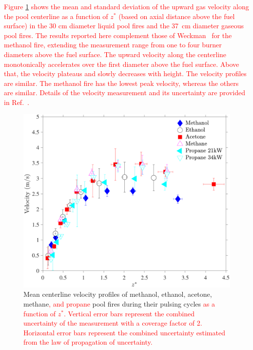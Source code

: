 \documentclass[12pt]{article}
\begin{document}
\textcolor{red}{Figure \ref{fig:Vel_Comparison} shows the mean and standard deviation of the upward gas velocity along the pool centerline as a function of $z^*$ (based on axial distance above the fuel surface) in the 30 cm diameter liquid pool fires and the 37~cm diameter gaseous pool fires. The results reported here complement those of Weckman~\cite{Weckman1996} for the methanol fire, extending the measurement range from one to four burner diameters above the fuel surface. The upward velocity along the centerline monotonically accelerates over the first diameter above the fuel surface. Above that, the velocity plateaus and slowly decreases with height. The velocity profiles are similar. The methanol fire has the lowest peak velocity, whereas the others are similar. Details of the velocity measurement and its uncertainty are provided in Ref.~\cite{Sung2021}.}


\begin{figure}[h!]
	\centering
\includegraphics[width=10.0 cm, keepaspectratio]{Velocity_Comparison.pdf}
	\caption[Mean centerline velocity profiles]{Mean centerline velocity profiles of methanol, ethanol, acetone, methane\textcolor{red}{, and propane} pool fires during their pulsing cycles \textcolor{red}{ as a function of $z^*$. Vertical error bars represent the combined uncertainty of the measurement with a coverage factor of 2. Horizontal error bars represent the combined uncertainty estimated from the law of propagation of uncertainty.}}
	\label{fig:Vel_Comparison}
\end{figure}
\end{document}
